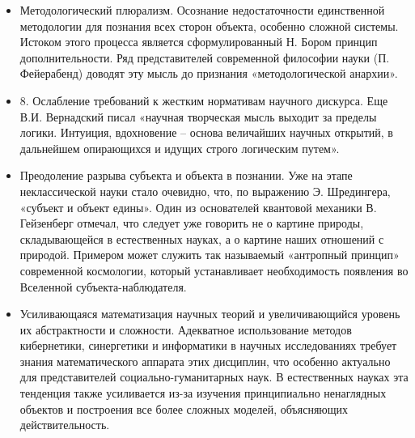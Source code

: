 \begin{itemize}
    \item Методологический плюрализм. Осознание недостаточности единственной методологии для познания всех сторон объекта, особенно сложной системы. Истоком этого процесса является сформулированный Н. Бором принцип дополнительности. Ряд представителей современной философии науки (П. Фейерабенд) доводят эту мысль до признания «методологической анархии».
    \item 8. Ослабление требований к жестким нормативам научного дискурса. Еще В.И. Вернадский писал «научная творческая мысль выходит за пределы логики. Интуиция, вдохновение – основа величайших научных открытий, в дальнейшем опирающихся и идущих строго логическим путем».
    \item Преодоление разрыва субъекта и объекта в познании. Уже на этапе неклассической науки стало очевидно, что, по выражению Э. Шредингера, «субъект и объект едины». Один из основателей квантовой механики В.  Гейзенберг отмечал, что следует уже говорить не о картине природы, складывающейся в естественных науках, а о картине наших отношений с природой. Примером может служить так называемый «антропный принцип» современной космологии, который устанавливает необходимость появления во Вселенной субъекта-наблюдателя.
    \item Усиливающаяся математизация научных теорий и увеличивающийся уровень их абстрактности и сложности. Адекватное использование методов кибернетики, синергетики и информатики в научных исследованиях требует знания математического аппарата этих дисциплин, что особенно актуально для представителей социально-гуманитарных наук. В естественных науках эта тенденция также усиливается из-за изучения принципиально ненаглядных объектов и построения все более сложных моделей, объясняющих действительность.
\end{itemize}